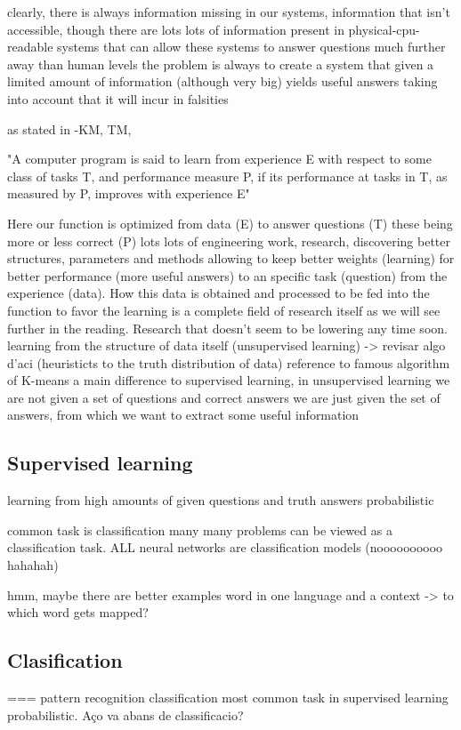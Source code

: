 \documentclass[11pt,english,listoffigures,listoftables]{tfgetsinf}
\begin{document}
clearly, there is always information missing in our systems, information that isn't accessible, though there are lots lots of information present in physical-cpu-readable systems that can allow these systems to answer questions much further away than human levels
the problem is always to create a system that given a limited amount of information (although very big) yields  useful answers taking into account that it will incur in falsities

as stated in -KM, TM,

"A computer program is said to learn from experience E with respect to some class of tasks T, and performance measure P, if its performance at tasks in T, as measured by P, improves with experience E"

Here our function is optimized from data (E) to answer questions (T) these being more or less correct (P)
lots lots of engineering work, research, discovering better structures, parameters and methods allowing to keep better weights (learning) for better performance (more useful answers) to an specific task (question) from the experience (data). How this data is obtained and processed to be fed into the function to favor the learning is a complete field of research itself as we will see further in the reading.
Research that doesn't seem to be lowering any time soon.
learning from the structure of data itself (unsupervised learning) -> revisar algo d'aci (heuristicts to the truth distribution of data)
reference to famous algorithm of K-means
a main difference to supervised learning, in unsupervised learning we are not given a set of questions and correct answers
we are just given the set of answers, from which we want to extract some useful information

\subsection{Supervised learning}
learning from high amounts of given questions and truth answers 
probabilistic

common task is classification
many many problems can be viewed as a classification task.
ALL neural networks are classification models (noooooooooo hahahah)

hmm, maybe there are better examples
word in one language and a context -> to which word gets mapped?

\subsection{Clasification}
=== pattern recognition
classification most common task in supervised learning
probabilistic. Aço va abans de classificacio?
\end{document}
